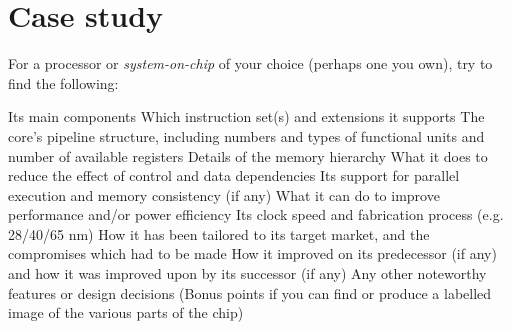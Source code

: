 \documentclass{supervision}
\begin{document}
\section*{Case study}

For a processor or \textit{system-on-chip} of your choice (perhaps one you own), try to find the following:

\begin{questions}
    \question
    Its main components
    \question
    Which instruction set(s) and extensions it supports
    \question
    The core's pipeline structure, including numbers and types of functional units and number of available registers
    \question
    Details of the memory hierarchy
    \question
    What it does to reduce the effect of control and data dependencies
    \question
    Its support for parallel execution and memory consistency (if any)
    \question
    What it can do to improve performance and/or power efficiency
    \question
    Its clock speed and fabrication process (e.g. 28/40/65 nm)
    \question
    How it has been tailored to its target market, and the compromises which had to be made
    \question
    How it improved on its predecessor (if any) and how it was improved upon by its successor (if any)
    \question
    Any other noteworthy features or design decisions
    \question
    (Bonus points if you can find or produce a labelled image of the various parts of the chip)
\end{questions}
\end{document}
